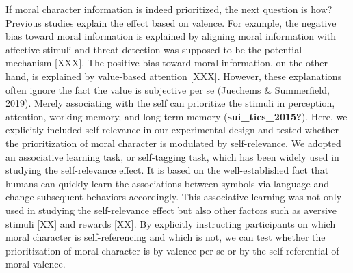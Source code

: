\documentclass[
  man]{apa6}
\begin{document}
If moral character information is indeed prioritized, the next question is how? Previous studies explain the effect based on valence. For example, the negative bias toward moral information is explained by aligning moral information with affective stimuli and threat detection was supposed to be the potential mechanism {[}XXX{]}. The positive bias toward moral information, on the other hand, is explained by value-based attention {[}XXX{]}. However, these explanations often ignore the fact the value is subjective per se (Juechems \& Summerfield, 2019). Merely associating with the self can prioritize the stimuli in perception, attention, working memory, and long-term memory (\textbf{sui\_tics\_2015?}). Here, we explicitly included self-relevance in our experimental design and tested whether the prioritization of moral character is modulated by self-relevance. We adopted an associative learning task, or self-tagging task, which has been widely used in studying the self-relevance effect. It is based on the well-established fact that humans can quickly learn the associations between symbols via language and change subsequent behaviors accordingly. This associative learning was not only used in studying the self-relevance effect but also other factors such as aversive stimuli {[}XX{]} and rewards {[}XX{]}. By explicitly instructing participants on which moral character is self-referencing and which is not, we can test whether the prioritization of moral character is by valence per se or by the self-referential of moral valence.
\end{document}
